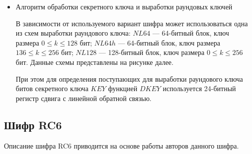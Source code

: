\documentclass{./civarticle}
\begin{document}
\begin{itemize}
    \item Алгоритм обработки секретного ключа и выработки раундовых ключей

    В зависимости от используемого вариант шифра может использоваться одна из схем выработки раундового ключа: $NL64$ --- 64-битный блок, ключ размера $0 \leq k \leq 128$ бит; $NL64h$ --- 64-битный блок, ключ размера $136 \leq k \leq 256$ бит; $NL128$ --- 128-битный блок, ключ размера $0 \leq k \leq 256$ бит. Данные схемы представлены на рисунке далее.

    \begin{figure}[h!]
    \end{figure}

    При этом для определения поступающих для выработки раундового ключа битов секретного ключа $KEY$ функцией $DKEY$ используется 24-битный регистр сдвига с линейной обратной связью.
    
\end{itemize}

\subsection{Шифр RC6}

Описание шифра RC6 приводится на основе работы \cite{rc6} авторов данного шифра.
\end{document}
